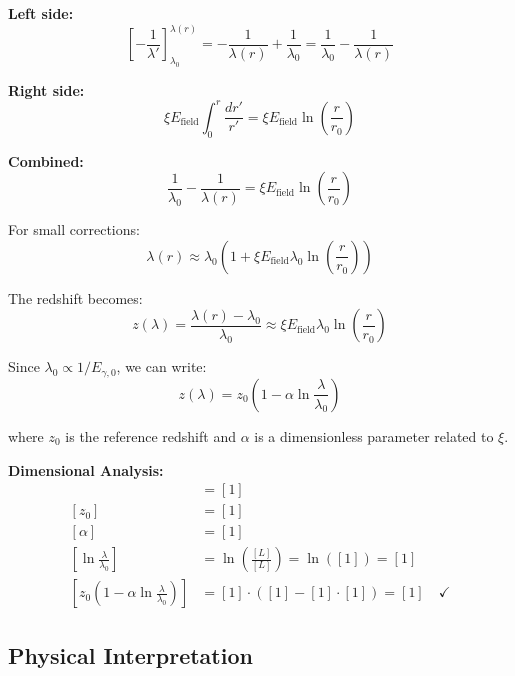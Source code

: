 \documentclass[12pt,a4paper]{report}
\begin{document}
	\textbf{Left side:}
	\begin{equation}
		\left[-\frac{1}{\lambda'}\right]_{\lambda_0}^{\lambda(r)} = -\frac{1}{\lambda(r)} + \frac{1}{\lambda_0} = \frac{1}{\lambda_0} - \frac{1}{\lambda(r)}
	\end{equation}
	
	\textbf{Right side:}
	\begin{equation}
		\xi E_{\text{field}} \int_0^r \frac{dr'}{r'} = \xi E_{\text{field}} \ln\left(\frac{r}{r_0}\right)
	\end{equation}
	
	\textbf{Combined:}
	\begin{equation}
		\frac{1}{\lambda_0} - \frac{1}{\lambda(r)} = \xi E_{\text{field}} \ln\left(\frac{r}{r_0}\right)
	\end{equation}
	
	For small corrections:
	\begin{equation}
		\lambda(r) \approx \lambda_0 \left(1 + \xi E_{\text{field}} \lambda_0 \ln\left(\frac{r}{r_0}\right)\right)
	\end{equation}
	
	The redshift becomes:
	\begin{equation}
		z(\lambda) = \frac{\lambda(r) - \lambda_0}{\lambda_0} \approx \xi E_{\text{field}} \lambda_0 \ln\left(\frac{r}{r_0}\right)
	\end{equation}
	
	Since $\lambda_0 \propto 1/E_{\gamma,0}$, we can write:
	\begin{equation}
		\boxed{z(\lambda) = z_0\left(1 - \alpha \ln\frac{\lambda}{\lambda_0}\right)}
		\label{eq:wavelength_dependent_redshift}
	\end{equation}
	
	where $z_0$ is the reference redshift and $\alpha$ is a dimensionless parameter related to $\xi$.
	
	\textbf{Dimensional Analysis:}
	\begin{align}
		[z(\lambda)] &= [1] \\
		[z_0] &= [1] \\
		[\alpha] &= [1] \\
		\left[\ln\frac{\lambda}{\lambda_0}\right] &= \ln\left(\frac{[L]}{[L]}\right) = \ln([1]) = [1] \\
		\left[z_0\left(1 - \alpha \ln\frac{\lambda}{\lambda_0}\right)\right] &= [1] \cdot ([1] - [1] \cdot [1]) = [1] \quad \checkmark
	\end{align}
	
	\subsection{Physical Interpretation}
	\label{subsec:physical_interpretation_redshift}
	
\end{document}
